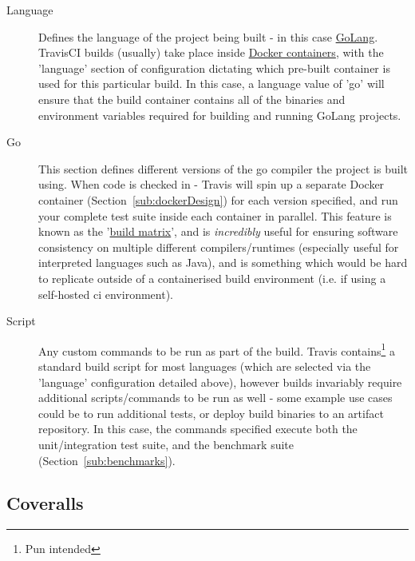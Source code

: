 \begin{description}
  \item[Language] Defines the language of the project being built - in this case
  \href{https://golang.org/}{GoLang}. TravisCI builds (usually) take place
  inside \href{https://www.docker.com/what-docker}{Docker containers}, with the
  'language' section of configuration dictating which pre-built container is
  used for this particular build. In this case, a language value of 'go' will
  ensure that the build container contains all of the binaries and environment
  variables required for building and running GoLang projects.
  \item[Go] This section defines different versions of the go compiler the
  project is built using. When code is checked in - Travis will spin up a
  separate Docker container (Section~\ref{sub:dockerDesign}) for each version
  specified, and run your complete test suite inside each container in parallel.
  This feature is known as the
  '\href{https://docs.travis-ci.com/user/customizing-the-build/#Build-Matrix}{build
  matrix}', and is \emph{incredibly} useful for ensuring software consistency on
  multiple different compilers/runtimes (especially useful for interpreted
  languages such as Java), and is something which would be hard to replicate
  outside of a containerised build environment (i.e. if using a self-hosted
  \gls{ci} environment).
  \item[Script] Any custom commands to be run as part of the build. Travis
  contains\footnote{Pun intended} a standard build script for most languages
  (which are selected via the 'language' configuration detailed above), however
  builds invariably require additional scripts/commands to be run as well - some
  example use cases could be to run additional tests, or deploy build binaries
  to an artifact repository. In this case, the commands specified execute both
  the unit/integration test suite, and the benchmark suite
  (Section~\ref{sub:benchmarks}).
\end{description}

\subsection{Coveralls}
\label{sub:Coveralls}

